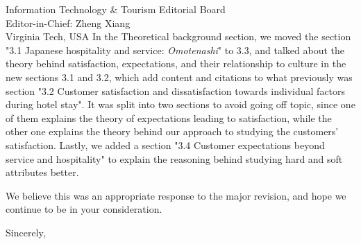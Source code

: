 \documentclass{letter}
\begin{document}
\begin{letter}{
Information Technology \& Tourism Editorial Board \\
Editor-in-Chief:  Zheng Xiang\\
Virginia Tech, USA}
In the Theoretical background section, we moved the section "3.1 Japanese hospitality and service: \textit{Omotenashi}" to 3.3, and talked about the theory behind satisfaction, expectations, and their relationship to culture in the new sections 3.1 and 3.2, which add content and citations to what previously was section "3.2 Customer satisfaction and dissatisfaction towards individual factors during hotel stay". It was split into two sections to avoid going off topic, since one of them explains the theory of expectations leading to satisfaction, while the other one explains the theory behind our approach to studying the customers' satisfaction. Lastly, we added a section "3.4 Customer expectations beyond service and hospitality" to explain the reasoning behind studying hard and soft attributes better.

We believe this was an appropriate response to the major revision, and hope we continue to be in your consideration.

\closing{Sincerely,}


\end{letter}
\end{document}
